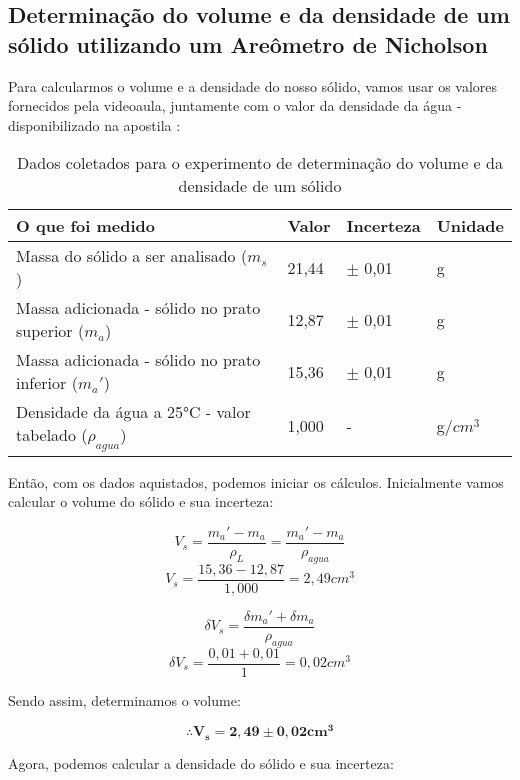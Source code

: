 \subsection{Determinação do volume e da densidade de um sólido
utilizando um Areômetro de Nicholson}

Para calcularmos o volume e a densidade do nosso sólido, vamos usar os valores fornecidos pela videoaula, juntamente com o valor da densidade da água - disponibilizado na apostila :

\begin{table}[H]
    \centering
    \begin{tabular}{ |M{6cm}||M{2cm}||M{2cm}||M{2cm}|  }
        \hline
        \textbf{O que foi medido} & \textbf{Valor} & \textbf{Incerteza} & \textbf{Unidade}\\
        \hline
        
        Massa do sólido a ser analisado ($m_s$)         & 21,44    & $\pm$ 0,01 & g\\
        
        Massa adicionada - sólido no prato superior ($m_a$)                     & 12,87     & $\pm$ 0,01 & g\\
        
        Massa adicionada - sólido no prato inferior ($m_a'$)    & 15,36     & $\pm$ 0,01 & g\\
        \hline
        
        Densidade da água a 25°C - valor tabelado  ($\rho _{agua}$)           & 1,000 & - & g/$cm^3$\\
        \hline
    \end{tabular}
    \caption{Dados coletados para o experimento de determinação do volume e da densidade de um sólido}
\end{table}

Então, com os dados aquistados, podemos iniciar os cálculos. Inicialmente vamos calcular o volume do sólido e sua incerteza:

\[ V_{s} = \frac{m_{a}' - m_a}{\rho _{L}} = \frac{m_{a}' - m_a}{\rho _{agua}}\]
\[ V_{s} = \frac{15,36 - 12,87}{1,000} = 2,49 cm^3 \]

\[ \delta V_s = \frac{\delta m_{a}' + \delta m_a}{\rho _{agua}} \]
\[ \delta V_s = \frac{0,01 + 0,01}{1} = 0,02 cm^3 \]

Sendo assim, determinamos o volume:

\[\mathbf{\therefore V_s = 2,49 \pm 0,02 cm^3} \]

Agora, podemos calcular a densidade do sólido e sua incerteza:

